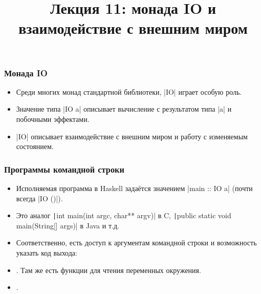 \documentclass[11pt]{beamer}
\title{Лекция 11: монада IO и взаимодействие с внешним миром}
\begin{document}
\begin{frame}[plain]
  \maketitle
\end{frame}

\begin{frame}[fragile]
  \frametitle{Монада IO}
  \begin{itemize}
    \item Среди многих монад стандартной библиотеки, \haskinline|IO| играет особую роль.
    \item Значение типа \haskinline|IO a| описывает вычисление с результатом типа \haskinline|a| и побочными эффектами.
    \item \haskinline|IO| описывает взаимодействие с внешним миром и работу с изменяемым состоянием.
  \end{itemize}
\end{frame}

\begin{frame}[fragile]
  \frametitle{Программы командной строки}
  \begin{itemize}
    \item Исполняемая программа в Haskell задаётся значением
          \haskinline|main :: IO a| (почти всегда \haskinline|IO ()|).
    \item Это аналог \texttt|int main(int argc, char** argv)| в C, \texttt|public static void main(String[] args)| в Java и т.д.
    \item Соответственно, есть доступ к аргументам командной строки и возможность указать код выхода:
    \item \href{https://hackage.haskell.org/package/base/docs/System-Environment.html}{}. Там же есть функции для чтения переменных окружения.
    \item \href{https://hackage.haskell.org/package/base/docs/System-Exit.html}{}.
  \end{itemize}
\end{frame}
\end{document}
